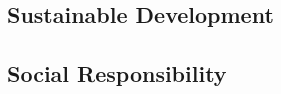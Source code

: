 \begin{sloppypar}
\subsection{Sustainable Development }


\subsection{Social Responsibility }





\end{sloppypar}


